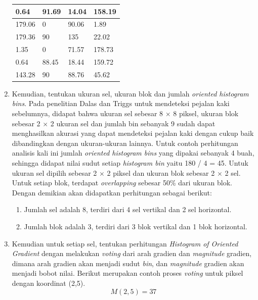 \begin{enumerate}
\begin{table}[H]
\begin{small}
\begin{tabular}{|p{2cm}|p{2cm}|p{2cm}|p{2cm}|}
			0.64 & 91.69 & 14.04 & 158.19 \\
			\hline
			179.06 & 0 & 90.06 & 1.89 \\
			\hline
			179.36 & 90 & 135 & 22.02 \\
			\hline
			1.35 & 0 & 71.57 & 178.73 \\
			\hline
			0.64 & 88.45 & 18.44 & 159.72 \\
			\hline
			143.28 & 90 & 88.76 & 45.62 \\
			\hline
		\end{tabular}
	\end{small}
	\label{fig:MatriksHasilPerhitunganArah}
\end{table}
\item Kemudian, tentukan ukuran sel, ukuran blok dan jumlah \textit{oriented histogram bins}. Pada penelitian Dalas dan Triggs untuk mendeteksi pejalan kaki sebelumnya, didapat bahwa ukuran sel sebesar 8 $\times$ 8 piksel, ukuran blok sebesar 2 $\times$ 2 ukuran sel dan jumlah bin sebanyak 9 sudah dapat menghasilkan akurasi yang dapat mendeteksi pejalan kaki dengan cukup baik dibandingkan dengan ukuran-ukuran lainnya. Untuk contoh perhitungan analisis kali ini jumlah \textit{oriented histogram bins} yang dipakai sebanyak 4 buah, sehingga didapat nilai sudut setiap \textit{histogram bin} yaitu 180 / 4 = 45. Untuk ukuran sel dipilih sebesar 2 $\times$ 2 piksel dan ukuran blok sebesar 2 $\times$ 2 sel. Untuk setiap blok, terdapat \textit{overlapping} sebesar 50\% dari ukuran blok. Dengan demikian akan didapatkan perhitungan sebagai berikut:
\begin{enumerate}[label=\alph*.]
\item Jumlah sel adalah 8, terdiri dari 4 sel vertikal dan 2 sel horizontal.
\item Jumlah blok adalah 3, terdiri dari 3 blok vertikal dan 1 blok horizontal.
\end{enumerate}
\item Kemudian untuk setiap sel, tentukan perhitungan \textit{Histogram of Oriented Gradient} dengan melakukan \textit{voting} dari arah gradien dan \textit{magnitude} gradien, dimana arah gradien akan menjadi sudut \textit{bin}, dan \textit{magnitude} gradien akan menjadi bobot nilai. Berikut merupakan contoh proses \textit{voting} untuk piksel dengan koordinat (2,5).
\begin{equation*}
M(2,5) = 37
\end{equation*}
\begin{equation*}

\end{equation*}
\end{enumerate}
